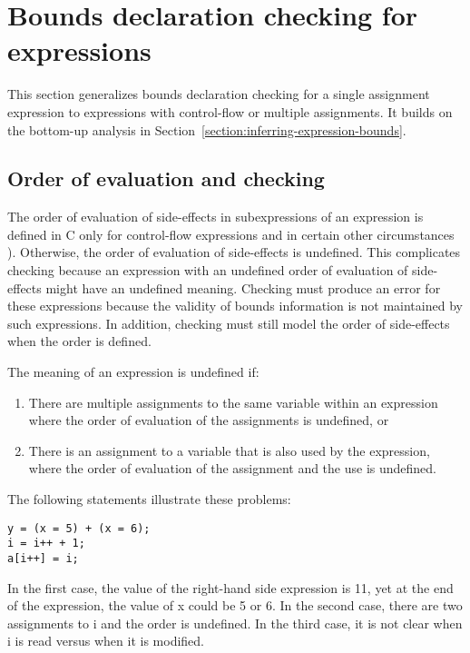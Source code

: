 \section{Bounds declaration checking for expressions}

\label{section:checking-complex-expressions}

This section generalizes bounds declaration checking for a single
assignment expression to expressions with control-flow or multiple
assignments.
It builds on the bottom-up analysis in
Section~\ref{section:inferring-expression-bounds}.

\subsection{Order of evaluation and checking}
\label{section:avoiding-undefinedness}

The order of evaluation of side-effects in subexpressions of an expression is defined in C only for 
control-flow expressions and in certain other circumstances \cite[Section 6.5,Annex C]{ISO2011}).
Otherwise, the order of evaluation of side-effects is undefined.   This complicates checking 
because an expression with an undefined order of evaluation of side-effects might have an 
undefined meaning.  Checking must produce an error for these expressions because the
validity of bounds information is not maintained by such expressions. In addition, checking must still
model the order of side-effects when the order is defined.

The meaning of an expression is undefined if:

\begin{enumerate}
\item
  There are multiple assignments to the same variable within an
  expression where the order of evaluation of the assignments is
  undefined, or
\item
  There is an assignment to a variable that is also used by the
  expression, where the order of evaluation of the assignment and the
  use is undefined.
\end{enumerate}

The following statements illustrate these problems:

\begin{lstlisting}
y = (x = 5) + (x = 6);
i = i++ + 1;
a[i++] = i;
\end{lstlisting}


In the first case, the value of the right-hand side expression is 11,
yet at the end of the expression, the value of x could be 5 or 6. In the
second case, there are two assignments to i and the order is undefined.
In the third case, it is not clear when i is read versus when it is
modified.

